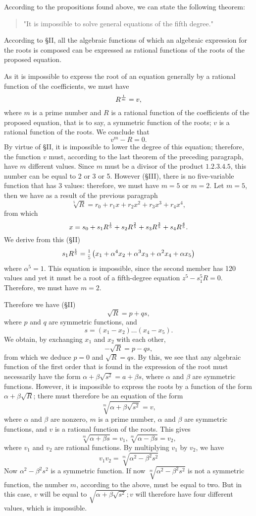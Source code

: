 \documentclass[oneside, 12 pt, leqno]{memoir}
\let\oldfrac\frac
\def\frac#1#2{\mathchoice{\text{\scalebox{.83}{${\oldfrac{#1}{#2}}$}}}{\text{\scalebox{.83}{${\displaystyle\oldfrac{#1}{#2}}$}}}{\genfrac{}{}{}{2}{#1}{#2}}{\genfrac{}{}{}{3}{#1}{#2}}}
\begin{document}
According to the propositions found above, we can state the following theorem:

\begin{quote}"It is impossible to solve general equations of the fifth degree."\end{quote}

According to \S II, all the algebraic functions of which an algebraic expression for the roots is composed can be expressed as rational functions of the roots of the proposed equation.

As it is impossible to express the root of an equation generally by a rational function of the coefficients, we must have
\[R^{\frac{1}{m}}=v,\]
where \(m\) is a prime number and \(R\) is a rational function of the coefficients of the proposed equation, that is to say, a symmetric function of the roots; \(v\) is a rational function of the roots. We conclude that
\[v^m-R=0.\]
By virtue of \S II, it is impossible to lower the degree of this equation; therefore, the function \(v\) must, according to the last theorem of the preceding paragraph, have \(m\) different values. Since \(m\) must be a divisor of the product \(1.2.3.4.5\), this number can be equal to 2 or 3 or 5. However (\S III), there is no five-variable function that has 3 values: therefore, we must have \(m=5\) or \(m=2\). Let \(m=5\), then we have as a result of the previous paragraph
\[\sqrt[5]{R}=r_0+r_1 x+r_2 x^2+r_3 x^3+r_4 x^4,\]
from which
\[x=s_0+s_1 R^{\frac{1}{5}}+s_2 R^{\frac{2}{5}}+s_3 R^{\frac{3}{5}}+s_4 R^{\frac{4}{5}}.\]
We derive from this (\S II)
\[s_1 R^{\frac{1}{5}}=\frac{1}{5}\left(x_1+\alpha^4 x_2+\alpha^3 x_3+\alpha^2 x_4+\alpha x_5\right)\]
where \(\alpha^5=1\). This equation is impossible, since the second member has 120 values and yet it must be a root of a fifth-degree equation \(z^5-s_1^5 R=0\). Therefore, we must have \(m=2\).

Therefore we have (\S II)
\[\sqrt{R}=p+q s,\]
where \(p\) and \(q\) are symmetric functions, and
\[s=\left(x_1-x_2\right) \dots\left(x_4-x_5\right).\]
We obtain, by exchanging \(x_1\) and \(x_2\) with each other,
\[-\sqrt{R}=p-q s,\]
from which we deduce \(p=0\) and \(\sqrt{R}= q s\). By this, we see that any algebraic function of the first order that is found in the expression of the root must necessarily have the form \(\alpha+\beta \sqrt{s^2}=a+\beta s\), where \(\alpha\) and \(\beta\) are symmetric functions. However, it is impossible to express the roots by a function of the form \(\alpha+\beta \sqrt{R}\); there must therefore be an equation of the form
\[\sqrt[m]{\alpha+\beta \sqrt{s^2}}=v,\]
where \(\alpha\) and \(\beta\) are nonzero, \(m\) is a prime number, \(\alpha\) and \(\beta\) are symmetric functions, and \(v\) is a rational function of the roots. This gives
\[\sqrt[m]{\alpha+\beta s}=v_1, \sqrt[m]{\alpha-\beta s}=v_2,\]
where \(v_1\) and \(v_2\) are rational functions. By multiplying \(v_1\) by \(v_2\), we have
\[v_1 v_2=\sqrt[m]{\alpha^2-\beta^2 s^2}\]
Now \(\alpha^2-\beta^2 s^2\) is a symmetric function. If now \(\sqrt[m]{\alpha^2-\beta^2 s^2}\) is not a symmetric function, the number \(m\), according to the above, must be equal to two. But in this case, \(v\) will be equal to \(\sqrt{\alpha+\beta \sqrt{s^2}} ; v\) will therefore have four different values, which is impossible.
\end{document}
